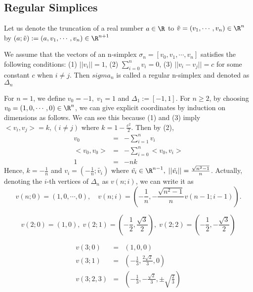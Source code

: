 \documentclass{article}
\begin{document}
\subsection{Regular Simplices}
\label{sec-2-1}
Let us denote the truncation of a real number $a\in \R$ to $\tilde v = (v_1, \cdots, v_{n}) \in \R^{n}$ by $(a;\tilde v) := (a,v_1, \cdots, v_n) \in \R^{n+1}$
\begin{Def}
 We assume that the vectors of an n-simplex $\sigma_n = [v_0,v_1,\cdots,v_n]$ satisfies the following conditions: (1) $||v_i||=1$, (2) $\sum_{i=0}^{n}v_i=0$, (3) $||v_i - v_j|| = c$ for some constant $c$ when $i\ne j$. Then $sigma_n$ is called a regular n-simplex and denoted as $\Delta_n$
\end{Def}
For $n=1$, we define $v_0 = -1, \; v_1 = 1$ and $\Delta_1 := [-1,1]$. For $n\ge 2$, by choosing $v_0 = (1,0,\cdots,0)\in \R^n$, we can give explicit coordinates by induction on dimensions as follows. We can see this because (1) and (3) imply $<v_i,v_j> = k, (i\ne j)$ where $k=1-\frac{c^2}{2}$. Then by (2),
\begin{eqnarray}
v_0 & = & - \sum_{i=1}^{n}v_i \nonumber \\
<v_0,v_0> & = & - \sum_{i=0}^{n} <v_0,v_i> \nonumber \\
1 &=& - nk \nonumber
\end{eqnarray}
Hence, $k=-\frac{1}{n}$ and $v_i = (-\frac{1}{n};\tilde{v_i})$ where $\tilde{v_i}\in \R^{n-1}, \; ||\tilde{v_i}|| = \frac{\sqrt{n^2-1}}{n}$. Actually, denoting the $i$-th vertices of $\Delta_n$ as $v(n;i)$, we can write it as 
\begin{equation}
\label{}
v(n;0) = (1,0,\cdots,0), \quad v(n;i) = (-\frac{1}{n}, -\frac{\sqrt{n^2-1}}{n} v(n-1;i-1)).
\end{equation}
\begin{exa}
 \begin{equation}
\label{}
v(2;0) = (1,0), \; v(2;1)=  \left( -\frac{1}{2}, \frac{\sqrt{3}}{2}\right) , \; v(2;2)=  \left( -\frac{1}{2}, -\frac{\sqrt{3}}{2}\right)
\end{equation}
\end{exa}
\begin{exa}
\begin{eqnarray}
v(3;0) & = & (1,0,0)  \nonumber\\
v(3;1) & = & \left(-\frac{1}{3}, \frac{2\sqrt{2}}{3},0\right) \nonumber\\
v(3;2,3) &=& \left(-\frac{1}{3}, -\frac{\sqrt{2}}{3},\pm \sqrt{\frac{2}{3}}\right) \nonumber
\end{eqnarray}
\end{exa}
\end{document}
